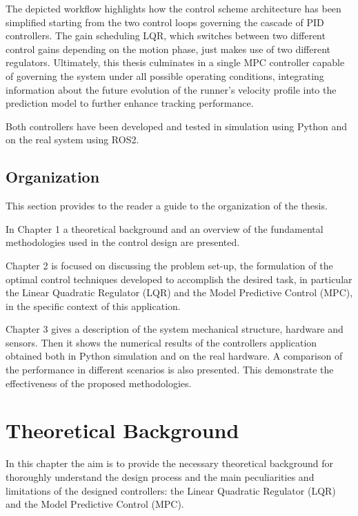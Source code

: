 \documentclass[a4paper,12pt,oneside]{book}
\begin{document}
\bigskip
The depicted workflow highlights how the control scheme architecture has been simplified starting from the two control loops governing the cascade of PID controllers. The gain scheduling LQR, which switches between two different control gains depending on the motion phase, just makes use of two different regulators. Ultimately, this thesis culminates in a single MPC controller capable of governing the system under all possible operating conditions, integrating information about the future evolution of the runner's velocity profile into the prediction model to further enhance tracking performance.

\bigskip
Both controllers have been developed and tested in simulation using Python and on the real system using ROS2.

\section*{Organization}
This section provides to the reader a guide to the organization of the thesis. 

In Chapter 1 a theoretical background and an overview of the fundamental methodologies used in the control design are presented. 

Chapter 2 is focused on discussing the problem set-up, the formulation of the optimal control techniques developed to accomplish the desired task, in particular the Linear Quadratic Regulator (LQR) and the Model Predictive Control (MPC), in the specific context of this application.

Chapter 3 gives a description of the system mechanical structure, hardware and sensors. Then it shows the numerical results of the controllers application obtained both in Python simulation and on the real hardware. A comparison of the performance in different scenarios is also presented.
This demonstrate the effectiveness of the proposed methodologies.

\chapter{Theoretical Background}
\label{chapter:Theoretical_Background}
In this chapter the aim is to provide the necessary theoretical background for thoroughly understand the design process and the main peculiarities and limitations of the designed controllers: the Linear Quadratic Regulator (LQR) and the Model Predictive Control (MPC).
\end{document}
